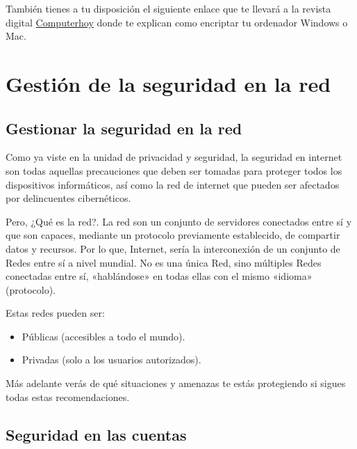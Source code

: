 \documentclass[
  a4paper,
  openany]{book}
\providecommand{\tightlist}{%
  \setlength{\itemsep}{0pt}\setlength{\parskip}{0pt}}
\begin{document}
También tienes a tu disposición el siguiente enlace que te llevará a la revista digital \href{https://computerhoy.com/tutoriales/tecnologia/como-cifrar-disco-duro-memoria-externa-nadie-pueda-acceder-ella-386434}{Computerhoy} donde te explican como encriptar tu ordenador Windows o Mac.

\hypertarget{gestiuxf3n-de-la-seguridad-en-la-red}{%
\chapter{Gestión de la seguridad en la red}\label{gestiuxf3n-de-la-seguridad-en-la-red}}

\hypertarget{gestionar-la-seguridad-en-la-red}{%
\section{Gestionar la seguridad en la red}\label{gestionar-la-seguridad-en-la-red}}

Como ya viste en la unidad de privacidad y seguridad, la seguridad en internet son todas aquellas precauciones que deben ser tomadas para proteger todos los dispositivos informáticos, así como la red de internet que pueden ser afectados por delincuentes cibernéticos.

Pero, ¿Qué es la red?. La red son un conjunto de servidores conectados entre sí y que son capaces, mediante un protocolo previamente establecido, de compartir datos y recursos. Por lo que, Internet, sería la interconexión de un conjunto de Redes entre sí a nivel mundial. No es una única Red, sino múltiples Redes conectadas entre sí, «hablándose» en todas ellas con el mismo «idioma» (protocolo).

Estas redes pueden ser:

\begin{itemize}
\tightlist
\item
  Públicas (accesibles a todo el mundo).
\item
  Privadas (solo a los usuarios autorizados).
\end{itemize}

Más adelante verás de qué situaciones y amenazas te estás protegiendo si sigues todas estas recomendaciones.

\hypertarget{seguridad-en-las-cuentas}{%
\section{Seguridad en las cuentas}\label{seguridad-en-las-cuentas}}
\end{document}
